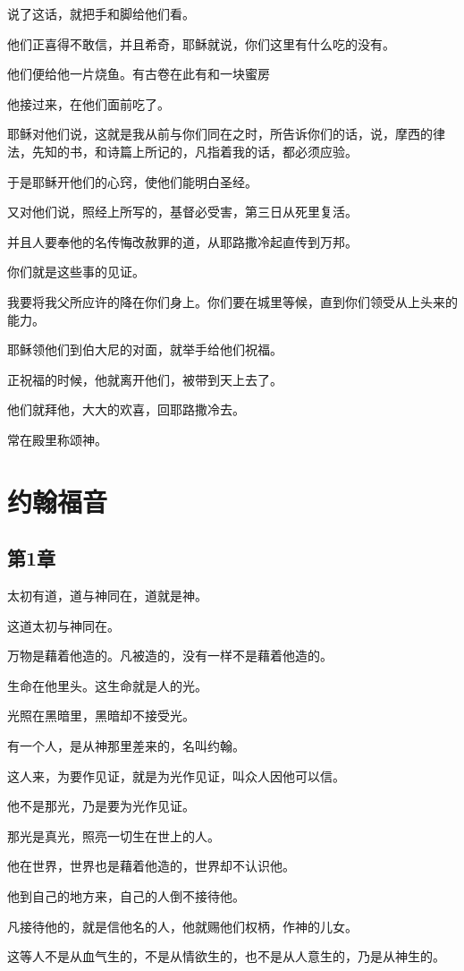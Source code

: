 \documentclass[12pt,oneside]{book}
\begin{document}
说了这话，就把手和脚给他们看。

他们正喜得不敢信，并且希奇，耶稣就说，你们这里有什么吃的没有。

他们便给他一片烧鱼。有古卷在此有和一块蜜房

他接过来，在他们面前吃了。

耶稣对他们说，这就是我从前与你们同在之时，所告诉你们的话，说，摩西的律法，先知的书，和诗篇上所记的，凡指着我的话，都必须应验。

于是耶稣开他们的心窍，使他们能明白圣经。

又对他们说，照经上所写的，基督必受害，第三日从死里复活。

并且人要奉他的名传悔改赦罪的道，从耶路撒冷起直传到万邦。

你们就是这些事的见证。

我要将我父所应许的降在你们身上。你们要在城里等候，直到你们领受从上头来的能力。

耶稣领他们到伯大尼的对面，就举手给他们祝福。

正祝福的时候，他就离开他们，被带到天上去了。

他们就拜他，大大的欢喜，回耶路撒冷去。

常在殿里称颂神。

\part{约翰福音}
\chapter{第1章}
太初有道，道与神同在，道就是神。

这道太初与神同在。

万物是藉着他造的。凡被造的，没有一样不是藉着他造的。

生命在他里头。这生命就是人的光。

光照在黑暗里，黑暗却不接受光。

有一个人，是从神那里差来的，名叫约翰。

这人来，为要作见证，就是为光作见证，叫众人因他可以信。

他不是那光，乃是要为光作见证。

那光是真光，照亮一切生在世上的人。

他在世界，世界也是藉着他造的，世界却不认识他。

他到自己的地方来，自己的人倒不接待他。

凡接待他的，就是信他名的人，他就赐他们权柄，作神的儿女。

这等人不是从血气生的，不是从情欲生的，也不是从人意生的，乃是从神生的。
\end{document}
